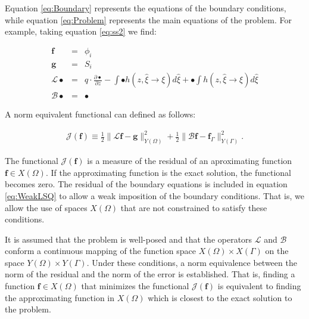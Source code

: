 \documentclass{CFD2011}
\newcommand{\Fede}[1]{\textcolor{green}{Fede: #1} \\}
\newcommand{\Pablo}[1]{#1}
\begin{document}
Equation \ref{eq:Boundary} represents the equations of the boundary conditions, while  equation \ref{eq:Problem} represents the main equations of the problem. 
For example, taking equation \ref{eq:ss2} we find:

\begin{eqnarray}
\mathbf{f}&=&\phi_i \nonumber \\
\mathbf{g}&=&S_i \label{eq:problem} \\
\mathcal{L}\bullet&=& q \cdot \frac{\partial \bullet}{\partial z} - \int \bullet h(z, \hat \xi \rightarrow \xi) d\hat \xi +\bullet\int h(z, \hat \xi \rightarrow \xi) d\hat \xi \nonumber\\
\mathcal{B}\bullet&=&  \bullet
 \nonumber
\end{eqnarray}

\Pablo{A} norm equivalent functional \Pablo{can} defined as follows:

\begin{eqnarray} 
\mathcal{J}(\mathbf{f})\equiv  \frac{1}{2}\parallel \mathcal{L} \mathbf{f} -\mathbf{g} \parallel_{Y(\Omega)}^2 + \frac{1}{2} \parallel \mathcal{B}\mathbf{f} - \mathbf{f}_{\Gamma} \parallel_{Y(\Gamma)}^2. 
\label{eq:WeakLSQ}
\end{eqnarray}

\Pablo{The functional $\mathcal{J}(\mathbf{f})$} is a measure of the residual of an aproximating function $\mathbf{f}\in X(\Omega)$. If the approximating function is the exact solution, the functional becomes zero.
The residual of the boundary equations is included in equation \ref{eq:WeakLSQ} to allow a weak imposition of the boundary conditions. That is, we allow the use of spaces $X(\Omega)$ that are not constrained to satisfy these conditions. 


It is assumed that the problem is well-posed and that the operators $\mathcal{L}$ and $\mathcal{B}$ conform a continuous mapping of the function space $X(\Omega)\times X(\Gamma)$ on the space $Y(\Omega) \times Y(\Gamma)$. Under these conditions, a norm equivalence between the norm of the residual and the norm of the error is established. That is, finding a function $\mathbf{f}\in X(\Omega)$ that minimizes the functional $\mathcal{J}(\mathbf{f})$ is equivalent to finding the approximating function in $X(\Omega)$ which is closest to the exact solution to the problem. 
\end{document}
